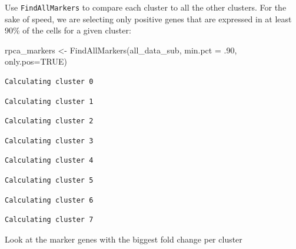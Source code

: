 \documentclass[
  letterpaper,
  DIV=11,
  numbers=noendperiod]{scrreprt}
\newenvironment{Shaded}{\begin{snugshade}}{\end{snugshade}}
\newcommand{\AttributeTok}[1]{\textcolor[rgb]{0.40,0.45,0.13}{#1}}
\newcommand{\ConstantTok}[1]{\textcolor[rgb]{0.56,0.35,0.01}{#1}}
\newcommand{\DecValTok}[1]{\textcolor[rgb]{0.68,0.00,0.00}{#1}}
\newcommand{\FunctionTok}[1]{\textcolor[rgb]{0.28,0.35,0.67}{#1}}
\newcommand{\NormalTok}[1]{\textcolor[rgb]{0.00,0.23,0.31}{#1}}
\newcommand{\OtherTok}[1]{\textcolor[rgb]{0.00,0.23,0.31}{#1}}
\begin{document}
Use \texttt{FindAllMarkers} to compare each cluster to all the other
clusters. For the sake of speed, we are selecting only positive genes
that are expressed in at least 90\% of the cells for a given cluster:

\begin{Shaded}
\begin{Highlighting}[]
\NormalTok{rpca\_markers }\OtherTok{\textless{}{-}} \FunctionTok{FindAllMarkers}\NormalTok{(all\_data\_sub, }\AttributeTok{min.pct =}\NormalTok{ .}\DecValTok{90}\NormalTok{, }\AttributeTok{only.pos=}\ConstantTok{TRUE}\NormalTok{)}
\end{Highlighting}
\end{Shaded}

\begin{verbatim}
Calculating cluster 0
\end{verbatim}

\begin{verbatim}
Calculating cluster 1
\end{verbatim}

\begin{verbatim}
Calculating cluster 2
\end{verbatim}

\begin{verbatim}
Calculating cluster 3
\end{verbatim}

\begin{verbatim}
Calculating cluster 4
\end{verbatim}

\begin{verbatim}
Calculating cluster 5
\end{verbatim}

\begin{verbatim}
Calculating cluster 6
\end{verbatim}

\begin{verbatim}
Calculating cluster 7
\end{verbatim}

Look at the marker genes with the biggest fold change per cluster
\end{document}
